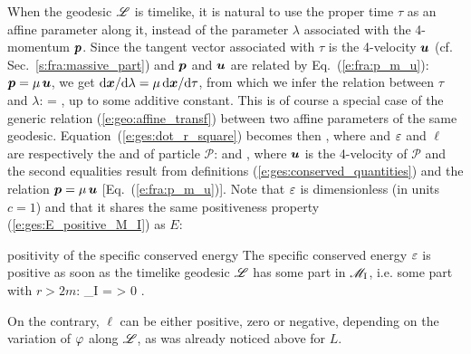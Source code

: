 When the geodesic $\mathscr{L}$ is timelike, it is natural to use the proper time $\tau$
as an affine parameter along it, instead of the parameter $\lambda$ associated
with the 4-momentum $\bm{p}$. Since the tangent vector associated with $\tau$
is the 4-velocity $\bm{u}$ (cf. Sec.~\ref{s:fra:massive_part}) and $\bm{p}$ and $\bm{u}$ are related by
Eq.~(\ref{e:fra:p_m_u}): $\bm{p} = \mu \, \bm{u}$, we get
$\mathrm{d}\bm{x}/\mathrm{d}\lambda = \mu \, \mathrm{d}\bm{x}/\mathrm{d}\tau$, from which we infer the relation
between $\tau$ and $\lambda$:
\be
    \tau = \mu \lambda ,
\ee
up to some additive constant. This is
of course a special case of the generic relation (\ref{e:geo:affine_transf})
between two affine parameters of the same geodesic.
Equation~(\ref{e:ges:dot_r_square}) becomes then
\be \label{e:ges:1d_motion_timelike}
     ,
\ee
where
\be \label{e:ges:V_eff_timelike}
\ee
and $\varepsilon$ and $\ell$ are respectively the
and 
of particle $\mathscr{P}$:
\be \label{e:ges:def_eps_ell}
  \qquad\mbox{and}\qquad
   ,
\ee
where $\bm{u}$ is the 4-velocity of $\mathscr{P}$ and the second equalities
result from definitions (\ref{e:ges:conserved_quantities})
and the relation $\bm{p} = \mu \, \bm{u}$ [Eq.~(\ref{e:fra:p_m_u})].
Note that $\varepsilon$ is dimensionless (in units $c=1$) and that it shares the
same positiveness property (\ref{e:ges:E_positive_M_I}) as $E$:
\begin{tprop}{positivity of the specific conserved energy}{}
The specific conserved energy $\varepsilon$ is positive as soon as the
timelike geodesic $\mathscr{L}$ has some part
in $\mathscr{M}_{\rm I}$, i.e. some part with $r>2m$:
\be \label{e:ges:eps_positive_M_I}
    \Li \cap \M_{\rm I} \not= \varnothing \quad \Longrightarrow \quad \veps > 0 .
\ee
\end{tprop}
On the contrary, $\ell$ can be either positive, zero or negative, depending
on the variation of $\varphi$ along $\mathscr{L}$, as was already noticed above for $L$.

